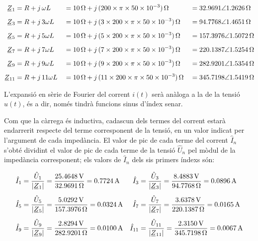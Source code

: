 \begin{exemple}
    \begin{alignat*}{3}
        \cmplx{Z}_1 &= R + j\, \omega L &&= \qty{10}{\ohm} + j\, (200\times \pi\times 50\times 10^{-3})\unit{\,\ohm} &&=
        \complexqty[complex-angle-unit = radians]{32,9691:1,2626}{\ohm}\\[1ex]
        \cmplx{Z}_3 &= R + j\, 3 \omega L &&= \qty{10}{\ohm} + j\, (3\times 200\times \pi\times 50\times 10^{-3})\unit{\,\ohm} &&=
        \complexqty[complex-angle-unit = radians]{94,7768:1,4651}{\ohm}\\[1ex]
        \cmplx{Z}_5 &= R + j\, 5 \omega L &&= \qty{10}{\ohm} + j\, (5\times 200\times \pi\times 50\times 10^{-3})\unit{\,\ohm} &&=
        \complexqty[complex-angle-unit = radians]{157,3976:1,5072}{\ohm}\\[1ex]
        \cmplx{Z}_7 &= R + j\, 7 \omega L &&= \qty{10}{\ohm} + j\, (7\times 200\times \pi\times 50\times 10^{-3})\unit{\,\ohm} &&=
        \complexqty[complex-angle-unit = radians]{220,1387:1,5254}{\ohm}\\[1ex]
        \cmplx{Z}_9 &= R + j\, 9 \omega L &&= \qty{10}{\ohm} + j\, (9\times 200\times \pi\times 50\times 10^{-3})\unit{\,\ohm} &&=
        \complexqty[complex-angle-unit = radians]{282,9201:1,5354}{\ohm}\\[1ex]
        \cmplx{Z}_{11} &= R + j\, 11 \omega L &&= \qty{10}{\ohm} + j\, (11\times 200\times \pi\times 50\times 10^{-3})\unit{\,\ohm} &&=
        \complexqty[complex-angle-unit = radians]{345,7198:1,5419}{\ohm}
    \end{alignat*}

    L'expansió en sèrie de Fourier del corrent $i(t)$ serà anàloga a la
    de la tensió $u(t)$, és a dir, només tindrà funcions sinus
    d'índex senar.

    Com que la càrrega és inductiva, cadascun dels
    termes del corrent estarà endarrerit respecte del terme corresponent
    de la tensió, en un valor indicat per l'argument de cada impedància.
    El valor de pic de cada terme del corrent $\hat{I}_n$ s'obté
    dividint el valor de pic de cada terme de la tensió $\hat{U}_n$ pel
    mòdul de la impedància corresponent; els valors de $\hat{I}_n$ dels sis primers índexs són:
    
    \begin{align*}
        \hat{I}_1 &= \frac{\hat{U}_1}{|\cmplx{Z}_1|} = \frac{\qty{25,4648}{V}}{\qty{32,9691}{\ohm}} = \qty{0,7724}{A}
        & \hat{I}_3 &= \frac{\hat{U}_3}{|\cmplx{Z}_3|} =\frac{\qty{8,4883}{V}}{\qty{94,7768}{\ohm}} = \qty{0,0896}{A}\\[1ex]
        \hat{I}_5 &= \frac{\hat{U}_5}{|\cmplx{Z}_5|} =\frac{\qty{5,0292}{V}}{\qty{157,3976}{\ohm}} =\qty{0,0324}{A}
        & \hat{I}_7 &= \frac{\hat{U}_7}{|\cmplx{Z}_7|} =\frac{\qty{3,6378}{V}}{\qty{220,1387}{\ohm}} =
        \qty{0,0165}{A}\\[1ex]
        \hat{I}_9 &= \frac{\hat{U}_9}{|\cmplx{Z}_9|} =\frac{\qty{2,8294}{V}}{\qty{282,9201}{\ohm}} =
        \qty{0,0100}{A} & \hat{I}_{11} &= \frac{\hat{U}_{11}}{|\cmplx{Z}_{11}|} =\frac{\qty{2,3150}{V}}
        {\qty{345,7198}{\ohm}} =  \qty{0,0067}{A}
    \end{align*}


\end{exemple}

